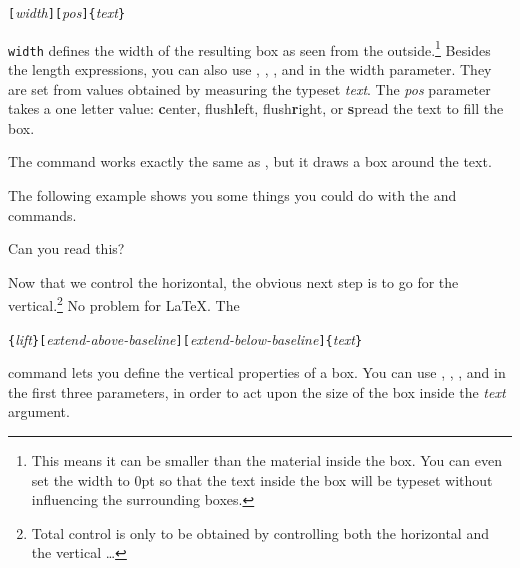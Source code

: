 \begin{lscommand}
  \verb|[|\emph{width}\verb|][|\emph{pos}\verb|]{|\emph{text}\verb|}|
\end{lscommand}

\noindent \texttt{width} defines the width of the resulting box as
seen from the outside.\footnote{This means it can be smaller than the
  material inside the box. You can even set the
  width to 0pt so that the text inside the box will be typeset without
  influencing the surrounding boxes.}  Besides the length
expressions, you can also use , , , and
 in the width parameter. They are set from values
obtained by measuring the typeset \emph{text}. The \emph{pos} parameter takes
a one letter value: \textbf{c}enter, flush\textbf{l}eft,
flush\textbf{r}ight, or \textbf{s}pread the text to fill the box.

The command  works exactly the same as , but
it draws a box around the text.

The following example shows you some things you could do with
the  and  commands.

\begin{example}
\par
{}\par
{} \par
\hspace{1cm} %
 \par
{}
Can you read this?
\end{example}

Now that we control the horizontal, the obvious next step is to go for
the vertical.\footnote{Total control is only to be obtained by
  controlling both the horizontal and the vertical \ldots}
No problem for \LaTeX{}. The

\begin{lscommand}
  \verb|{|\emph{lift}\verb|}[|\emph{extend-above-baseline}\verb|][|\emph{extend-below-baseline}\verb|]{|\emph{text}\verb|}|
\end{lscommand}

\noindent command lets you define the vertical properties of a
box. You can use , , , and
 in the first three parameters, in order to act
upon the size of the box inside the \emph{text} argument.

